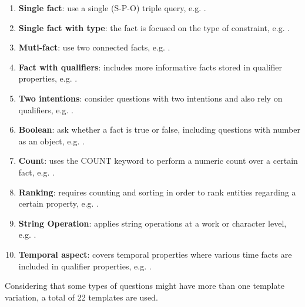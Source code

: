 \begin{enumerate}
    \item \textbf{Single fact}: use a single (S-P-O) triple query, e.g. .
    \item \textbf{Single fact with type}: the fact is focused on the type of constraint, e.g. 
    .
    \item \textbf{Muti-fact}: use two connected facts, e.g. .
    \item \textbf{Fact with qualifiers}: includes more informative facts stored in qualifier 
    properties, e.g. .
    \item \textbf{Two intentions}: consider questions with two intentions and also rely on 
    qualifiers, e.g. .
    \item \textbf{Boolean}: ask whether a fact is true or false, including questions with 
    number as an object, e.g. .
    \item \textbf{Count}: uses the COUNT keyword to perform a numeric count over a certain fact, 
    e.g. .
    \item \textbf{Ranking}: requires counting and sorting in order to rank entities regarding a 
    certain property, e.g. .
    \item \textbf{String Operation}: applies string operations at a work or character level, 
    e.g. .
    \item \textbf{Temporal aspect}: covers temporal properties where various time facts are 
    included in qualifier properties, e.g. .
\end{enumerate}

Considering that some types of questions might have more than one \SPARQL{} template variation, a 
total of 22 templates are used. 

